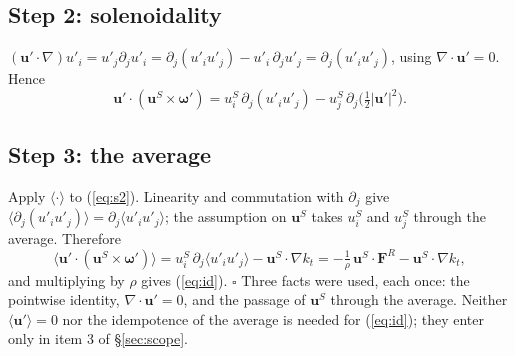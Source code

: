 \documentclass[10pt]{article}
\newcommand{\av}[1]{\langle #1\rangle}\newcommand{\uS}{\bm u^S}\newcommand{\WS}{\mathcal W_S}\newcommand{\PS}{\mathcal P_S}
\newcommand{\bu}{\bm u}\newcommand{\bU}{\bm U}\newcommand{\bxi}{\bm\xi}\newcommand{\dd}{\mathrm d}
\begin{document}
\subsection{Step 2: solenoidality}
$(\bu'\cdot\nabla)u'_i=u'_j\partial_ju'_i=\partial_j(u'_iu'_j)-u'_i\,\partial_ju'_j=\partial_j(u'_iu'_j)$, using $\nabla\cdot\bu'=0$. Hence
\begin{equation}
\bu'\cdot(\uS\times\bm\omega')=u^S_i\,\partial_j(u'_iu'_j)-u^S_j\,\partial_j\big(\tfrac12|\bu'|^2\big).
\label{eq:s2}
\end{equation}

\subsection{Step 3: the average}
Apply $\av\cdot$ to (\ref{eq:s2}). Linearity and commutation with $\partial_j$ give $\av{\partial_j(u'_iu'_j)}=\partial_j\av{u'_iu'_j}$; the assumption on $\uS$ takes $u^S_i$ and $u^S_j$ through the average. Therefore
\[
\av{\bu'\cdot(\uS\times\bm\omega')}=u^S_i\,\partial_j\av{u'_iu'_j}-\uS\!\cdot\nabla k_t
=-\tfrac1\rho\,\uS\!\cdot\bm F^R-\uS\!\cdot\nabla k_t ,
\]
and multiplying by $\rho$ gives (\ref{eq:id}). $\square$ Three facts were used, each once: the pointwise identity, $\nabla\cdot\bu'=0$, and the passage of $\uS$ through the average. Neither $\av{\bu'}=0$ nor the idempotence of the average is needed for (\ref{eq:id}); they enter only in item 3 of \S\ref{sec:scope}.
\end{document}
